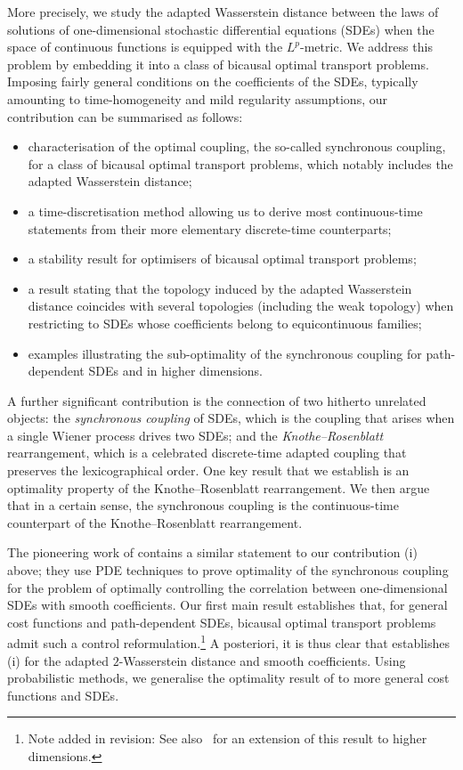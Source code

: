 \documentclass[oneside]{amsart}
\theoremstyle{definition}
\numberwithin{equation}{section}
\begin{document}
More precisely, we study the adapted Wasserstein distance between the 
laws of solutions of one-dimensional stochastic differential equations (SDEs) when the space of continuous functions is equipped with the $L^p$-metric. 
We address this problem by embedding it into a class of bicausal optimal transport problems. 
Imposing fairly general conditions on 
the coefficients of the SDEs, typically amounting to time-homogeneity and mild regularity assumptions, our contribution can be summarised as follows:
\begin{itemize}
\item [(i)] characterisation of the optimal coupling, the so-called synchronous coupling, for a class of bicausal optimal transport problems, which notably includes the adapted Wasserstein distance;
\item[(ii)]  a time-discretisation method allowing us to derive most continuous-time statements from their more elementary discrete-time counterparts; 
\item[(iii)] a stability result for optimisers of bicausal optimal transport problems;
\item[(iv)] a result stating that the topology induced by the adapted Wasserstein distance coincides with several topologies (including the weak topology) when restricting to SDEs whose coefficients belong to equicontinuous families;
\item[(v)] examples illustrating the sub-optimality of the synchronous coupling for path-dependent SDEs and in higher dimensions. 
\end{itemize}

A further significant contribution is the connection of two hitherto unrelated objects: the \emph{synchronous coupling} of SDEs, which is the coupling that arises when a single Wiener process drives two SDEs; and the \emph{Knothe--Rosenblatt} rearrangement, which is a celebrated discrete-time adapted coupling that preserves the lexicographical order. One key result that we establish is an optimality property of the Knothe--Rosenblatt rearrangement. 
We then argue that in a certain sense, the synchronous coupling is the continuous-time counterpart of the Knothe--Rosenblatt rearrangement.

The pioneering work of \citet{BiTa19} contains a similar statement to our contribution (i) above; they use PDE techniques to prove optimality of the synchronous coupling for the problem of optimally controlling the correlation between one-dimensional SDEs with smooth coefficients. 
Our first main result establishes that, for general cost functions and path-dependent SDEs, bicausal optimal transport problems admit such a control reformulation.\footnote{Note added in revision: See also~\citet{CoLi24} for an extension of this result to higher dimensions.}  
A posteriori, it is thus clear that \cite{BiTa19} establishes (i) for the adapted $2$-Wasserstein distance and smooth coefficients. 
Using probabilistic methods, we generalise the optimality result of \cite{BiTa19} to more general cost functions and SDEs. 	
	
\end{document}
